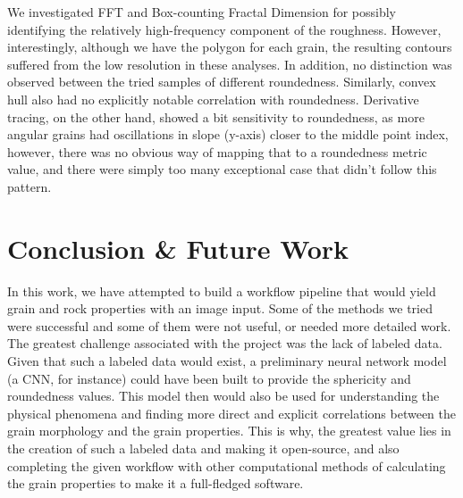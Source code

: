 \documentclass{article}
\begin{document}
We investigated FFT and Box-counting Fractal Dimension for possibly identifying the relatively high-frequency component of the roughness. However, interestingly, although we have the polygon for each grain, the resulting contours suffered from the low resolution in these analyses. In addition, no distinction was observed between the tried samples of different roundedness. Similarly, convex hull also had no explicitly notable correlation with roundedness. Derivative tracing, on the other hand, showed a bit sensitivity to roundedness, as more angular grains had oscillations in slope (y-axis) closer to the middle point index, however, there was no obvious way of mapping that to a roundedness metric value, and there were simply too many exceptional case that didn't follow this pattern.

\section{Conclusion \& Future Work}
In this work, we have attempted to build a workflow pipeline that would yield grain and rock properties with an image input. Some of the methods we tried were successful and some of them were not useful, or needed more detailed work. The greatest challenge associated with the project was the lack of labeled data. Given that such a labeled data would exist, a preliminary neural network model (a CNN, for instance) could have been built to provide the sphericity and roundedness values. This model then would also be used for understanding the physical phenomena and finding more direct and explicit correlations between the grain morphology and the grain properties. This is why, the greatest value lies in the creation of such a labeled data and making it open-source, and also completing the given workflow with other computational methods of calculating the grain properties to make it a full-fledged software.





\end{document}
